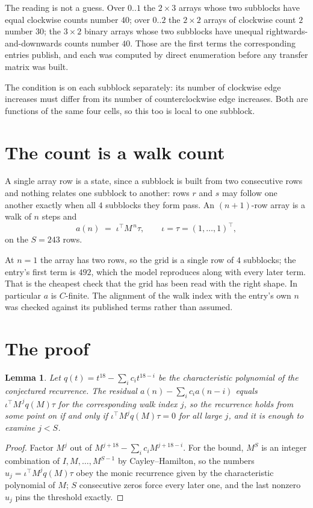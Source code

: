 \documentclass[11pt,a4paper]{article}
\theoremstyle{plain}
\newtheorem{lemma}[theorem]{Lemma}
\theoremstyle{definition}
\begin{document}
The reading is not a guess. Over $0..1$ the $2\times3$ arrays whose two subblocks have equal
clockwise counts number $40$; over $0..2$ the $2\times2$ arrays of clockwise count $2$ number
$30$; the $3\times2$ binary arrays whose two subblocks have unequal rightwards-and-downwards
counts number $40$. Those are the first terms the corresponding entries publish, and each was
computed by direct enumeration before any transfer matrix was built.

The condition is on each subblock separately: its number of clockwise edge increases must differ from its number
of counterclockwise edge increases. Both are functions of the same four cells, so this too is local to one
subblock.

\section{The count is a walk count}

A single array row is a state, since a subblock is built from two
consecutive rows and nothing relates one subblock to another: rows $r$ and $s$ may follow one
another exactly when all $4$ subblocks they form pass. An $(n+1)$-row array is a walk of $n$
steps and
\[
a(n)\;=\;\iota^{\!\top}M^{\,n}\tau,\qquad\iota=\tau=(1,\dots,1)^{\!\top},
\]
on the $S=243$ rows.

At $n=1$ the array has two rows, so the grid is a single row of $4$
subblocks; the entry's first term is $492$, which the model
reproduces along with every later term. That is the cheapest check that the grid has been read
with the right shape.
In particular $a$ is $C$-finite. The alignment of the walk index with the entry's own $n$ was
checked against its published terms rather than assumed.

\section{The proof}

\begin{lemma}\label{lem:crit}
Let $q(t)=t^{18}-\sum_i c_it^{18-i}$ be the characteristic polynomial of the
conjectured recurrence. The residual $a(n)-\sum_ic_ia(n-i)$ equals
$\iota^{\!\top}M^{\,j}q(M)\tau$ for the corresponding walk index $j$, so the recurrence
holds from some point on if and only if $\iota^{\!\top}M^{j}q(M)\tau=0$ for all large $j$,
and it is enough to examine $j<S$.
\end{lemma}

\begin{proof}
Factor $M^{j}$ out of $M^{j+18}-\sum_ic_iM^{j+18-i}$. For the bound, $M^{S}$
is an integer combination of $I,M,\dots,M^{S-1}$ by Cayley--Hamilton, so the numbers
$u_j=\iota^{\!\top}M^{j}q(M)\tau$ obey the monic recurrence given by the characteristic
polynomial of $M$; $S$ consecutive zeros force every later one, and the last nonzero $u_j$
pins the threshold exactly.
\end{proof}
\end{document}

